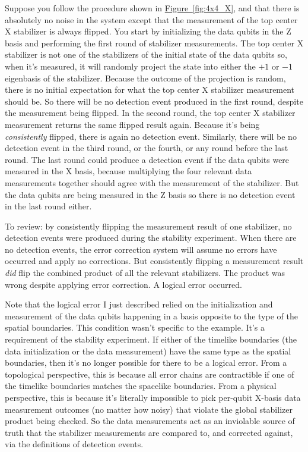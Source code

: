 \documentclass[onecolumn,unpublished,a4paper]{quantumarticle}
\theoremstyle{definition}
\theoremstyle{definition}
\theoremstyle{definition}
\newcommand{\fig}[1]{\hyperref[fig:#1]{Figure~\ref*{fig:#1}}}
\begin{document}
Suppose you follow the procedure shown in \fig{4x4_X}, and that there is absolutely no noise in the system except that the measurement of the top center X stabilizer is always flipped.
You start by initializing the data qubits in the Z basis and performing the first round of stabilizer measurements.
The top center X stabilizer is not one of the stabilizers of the initial state of the data qubits so, when it's measured, it will randomly project the state into either the $+1$ or $-1$ eigenbasis of the stabilizer.
Because the outcome of the projection is random, there is no initial expectation for what the top center X stabilizer measurement should be.
So there will be no detection event produced in the first round, despite the measurement being flipped.
In the second round, the top center X stabilizer measurement returns the same flipped result again.
Because it's being \emph{consistently} flipped, there is again no detection event.
Similarly, there will be no detection event in the third round, or the fourth, or any round before the last round.
The last round could produce a detection event if the data qubits were measured in the X basis, because multiplying the four relevant data measurements together should agree with the measurement of the stabilizer.
But the data qubits are being measured in the Z basis so there is no detection event in the last round either.

To review: by consistently flipping the measurement result of one stabilizer, no detection events were produced during the stability experiment.
When there are no detection events, the error correction system will assume no errors have occurred and apply no corrections.
But consistently flipping a measurement result \emph{did} flip the combined product of all the relevant stabilizers.
The product was wrong despite applying error correction.
A logical error occurred.

Note that the logical error I just described relied on the initialization and measurement of the data qubits happening in a basis opposite to the type of the spatial boundaries.
This condition wasn't specific to the example.
It's a requirement of the stability experiment.
If either of the timelike boundaries (the data initialization or the data measurement) have the same type as the spatial boundaries, then it's no longer possible for there to be a logical error.
From a topological perspective, this is because all error chains are contractible if one of the timelike boundaries matches the spacelike boundaries.
From a physical perspective, this is because it's literally impossible to pick per-qubit X-basis data measurement outcomes (no matter how noisy) that violate the global stabilizer product being checked.
So the data measurements act as an inviolable source of truth that the stabilizer measurements are compared to, and corrected against, via the definitions of detection events.
\end{document}
